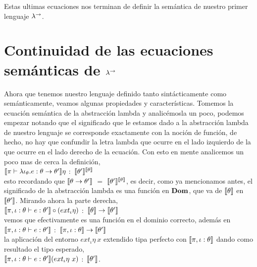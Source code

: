 Estas ultimas ecuaciones nos terminan de definir la sem\'antica de nuestro 
primer lenguaje $\lambda^{\rightarrow}$.

\section{Continuidad de las ecuaciones sem\'anticas de $\lambda^{\rightarrow}$}

Ahora que tenemos nuestro lenguaje definido tanto sint\'acticamente como
sem\'anticamente, veamos algunas propiedades y caracter\'isticas. Tomemos
la ecuaci\'on sem\'antica de la abstracci\'on lambda y analic\'emosla un 
poco, podemos empezar notando que el significado que le estamos dado
a la abstracci\'on lambda de nuestro lenguaje se corresponde exactamente
con la noci\'on de funci\'on, de hecho, no hay que confundir la letra lambda
que ocurre en el lado izquierdo de la que ocurre en el lado derecho de la
ecuaci\'on. Con esto en mente analicemos un poco mas de cerca la definici\'on,\\

$\llbracket \pi \vdash \lambda \iota_{\theta} . e : \theta \rightarrow \theta' \rrbracket\eta$ $:$
$\llbracket \theta' \rrbracket^{\llbracket \theta \rrbracket}$\\

\noindent
esto recordando que $\llbracket \theta \rightarrow \theta' \rrbracket$ $=$ $\llbracket \theta' \rrbracket^{\llbracket \theta \rrbracket}$,
es decir, como ya mencionamos antes, el significado de la abstracci\'on lambda es
una funci\'on en $\textbf{Dom}$, que va de $\llbracket \theta \rrbracket$ en $\llbracket \theta' \rrbracket$. Mirando
ahora la parte derecha,\\

$\llbracket \pi,\iota:\theta \vdash e : \theta' \rrbracket  \circ (ext_\iota \eta) $ $:$
	$\llbracket \theta \rrbracket \rightarrow \llbracket \theta' \rrbracket$\\

\noindent
vemos que efectivamente es una funci\'on en el dominio correcto, adem\'as en\\

$\llbracket \pi,\iota:\theta \vdash e : \theta' \rrbracket$ $:$ 
								$\llbracket \pi,\iota:\theta \rrbracket \rightarrow \llbracket \theta' \rrbracket$\\

\noindent
la aplicaci\'on del entorno $ext_\iota \eta \ x$ extendido tipa perfecto 
con $\llbracket \pi,\iota:\theta \rrbracket$ dando como resultado el tipo esperado,\\

$\llbracket \pi,\iota:\theta \vdash e : \theta' \rrbracket(ext_\iota \eta \ x)$ $:$ $\llbracket \theta' \rrbracket$.\\

